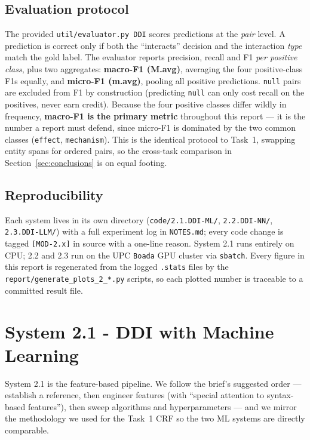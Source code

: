 \documentclass[a4paper,11pt]{article}
\begin{document}
\subsection{Evaluation protocol}
The provided \texttt{util/evaluator.py~DDI} scores predictions at the
\emph{pair} level. A prediction is correct only if both the
``interacts'' decision and the interaction \emph{type} match the gold
label. The evaluator reports precision, recall and F1 \emph{per positive
class}, plus two aggregates: \textbf{macro-F1 (M.avg)}, averaging the
four positive-class F1s equally, and \textbf{micro-F1 (m.avg)}, pooling
all positive predictions. \texttt{null} pairs are excluded from F1 by
construction (predicting \texttt{null} can only cost recall on the
positives, never earn credit). Because the four positive classes differ
wildly in frequency, \textbf{macro-F1 is the primary metric} throughout
this report --- it is the number a report must defend, since micro-F1 is
dominated by the two common classes (\texttt{effect}, \texttt{mechanism}).
This is the identical protocol to Task~1, swapping entity spans for
ordered pairs, so the cross-task comparison in
Section~\ref{sec:conclusions} is on equal footing.

\subsection{Reproducibility}
Each system lives in its own directory (\texttt{code/2.1.DDI-ML/},
\texttt{2.2.DDI-NN/}, \texttt{2.3.DDI-LLM/}) with a full experiment log
in \texttt{NOTES.md}; every code change is tagged \texttt{[MOD-2.x]} in
source with a one-line reason. System 2.1 runs entirely on CPU; 2.2 and
2.3 run on the UPC \texttt{Boada} GPU cluster via \texttt{sbatch}. Every
figure in this report is regenerated from the logged \texttt{.stats}
files by the \texttt{report/generate\_plots\_2\_*.py} scripts, so each
plotted number is traceable to a committed result file.

\section{System 2.1 - DDI with Machine Learning}\label{sec:ml}

System 2.1 is the feature-based pipeline. We follow the brief's
suggested order --- establish a reference, then engineer features (with
``special attention to syntax-based features''), then sweep algorithms
and hyperparameters --- and we mirror the methodology we used for the
Task~1 CRF so the two ML systems are directly comparable.
\end{document}
